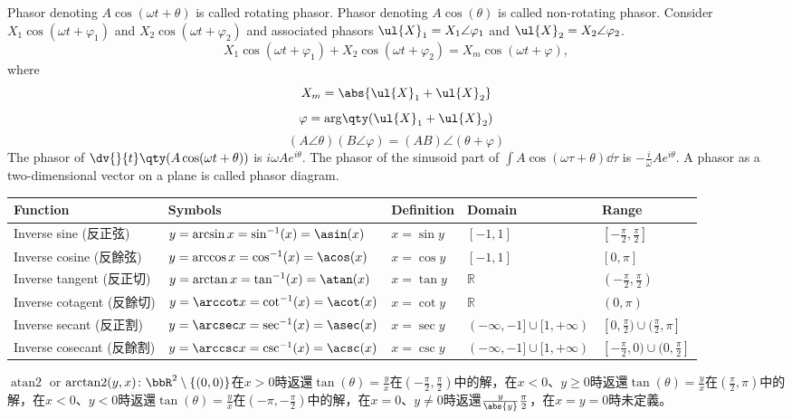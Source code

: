 \documentclass[a4paper,12pt]{report}
\begin{document}
Phasor denoting $A\cos(\omega t+\theta)$ is called rotating phasor. Phasor denoting $A\cos(\theta)$ is called non-rotating phasor.
Consider $X_1\cos(\omega t+\varphi_1)$ and $X_2\cos(\omega t+\varphi_2)$ and associated phasors $\ul{X}_1=X_1\angle\varphi_1$ and $\ul{X}_2=X_2\angle\varphi_2$.
\[X_1\cos(\omega t+\varphi_1)+X_2\cos(\omega t+\varphi_2)=X_m\cos(\omega t+\varphi),\]
where
\[X_m=\abs{\ul{X}_1+\ul{X}_2}\]
\[\varphi=\mathrm{arg}\qty(\ul{X}_1+\ul{X}_2)\]
\[(A\angle\theta)(B\angle\varphi)=(AB)\angle(\theta+\varphi)\]
The phasor of $\dv{}{t}\qty(A\cos(\omega t+\theta))$ is $i\omega Ae^{i\theta}$.
The phasor of the sinusoid part of $\int A\cos(\omega\tau+\theta)\dd{\tau}$ is $-\frac{i}{\omega}Ae^{i\theta}$.
A phasor as a two-dimensional vector on a plane is called phasor diagram.
{\fontsize{8pt}{10pt}\selectfont
\begin{longtable}[c]{|p{}|p{}|p{}|p{}|p{}|}
\hline
Function & Symbols & Definition & Domain & Range \\ 
\hline
    Inverse sine (反正弦) & \(y=\arcsin x=\sin^{-1}(x)=\asin(x)\) & \(x=\sin y\) & \([-1,1]\) & \([-\frac{\pi}{2},\frac{\pi}{2}]\) \\ \hline
    Inverse cosine (反餘弦) & \(y=\arccos x=\cos^{-1}(x)=\acos(x)\) & \(x=\cos y\) & \([-1,1]\) & \([0,\pi]\) \\ \hline
    Inverse tangent (反正切) & \(y=\arctan x=\tan^{-1}(x)=\atan(x)\) & \(x=\tan y\) & \(\mathbb{R}\) & \((-\frac{\pi}{2},\frac{\pi}{2})\) \\ \hline
    Inverse cotagent (反餘切) & \(y=\arccot x=\cot^{-1}(x)=\acot(x)\) & \(x=\cot y\) & \(\mathbb{R}\) & \((0,\pi)\) \\ \hline
    Inverse secant (反正割) & \(y=\arcsec x=\sec^{-1}(x)=\asec(x)\) & \(x=\sec y\) & \((-\infty,-1]\cup[1,+\infty)\) & \([0,\frac{\pi}{2})\cup(\frac{\pi}{2},\pi]\) \\ \hline
    Inverse cosecant (反餘割) & \(y=\arccsc x=\csc^{-1}(x)=\acsc(x)\) & \(x=\csc y\) & \((-\infty,-1]\cup[1,+\infty)\) & \([-\frac{\pi}{2},0)\cup(0,\frac{\pi}{2}]\) \\ \hline
\end{longtable}}
$\operatorname{atan2}$ or $\operatorname{arctan2}(y,x)\colon\bbR^2\setminus\{(0,0)\}$在$x>0$時返還$\tan(\theta)=\frac{y}{x}$在$(-\frac{\pi}{2},\frac{\pi}{2})$中的解，在$x<0$、$y\geq 0$時返還$\tan(\theta)=\frac{y}{x}$在$(\frac{\pi}{2},\pi)$中的解，在$x<0$、$y<0$時返還$\tan(\theta)=\frac{y}{x}$在$(-\pi,-\frac{\pi}{2})$中的解，在$x=0$、$y\neq 0$時返還$\frac{y}{\abs{y}}\frac{\pi}{2}$，在$x=y=0$時未定義。
\end{document}
